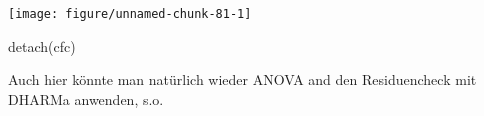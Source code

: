 \documentclass[a4paper,twoside]{tufte-book}\usepackage[]{graphicx}\usepackage[]{color}
\begin{document}
\begin{appendices}
\begin{Schunk}
\texttt{[image: figure/unnamed-chunk-81-1]} \begin{Sinput}
detach(cfc)
\end{Sinput}
\end{Schunk}

Auch hier könnte man natürlich wieder ANOVA and den Residuencheck mit DHARMa anwenden, s.o. 


\end{appendices}


 
\end{document}
